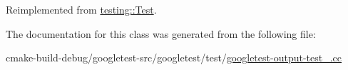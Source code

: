 Reimplemented from \mbox{\hyperlink{classtesting_1_1Test_a5f0ab439802cbe0ef7552f1a9f791923}{testing\+::\+Test}}.



The documentation for this class was generated from the following file\+:\begin{DoxyCompactItemize}
\item 
cmake-\/build-\/debug/googletest-\/src/googletest/test/\mbox{\hyperlink{googletest-output-test___8cc}{googletest-\/output-\/test\+\_\+.\+cc}}\end{DoxyCompactItemize}
